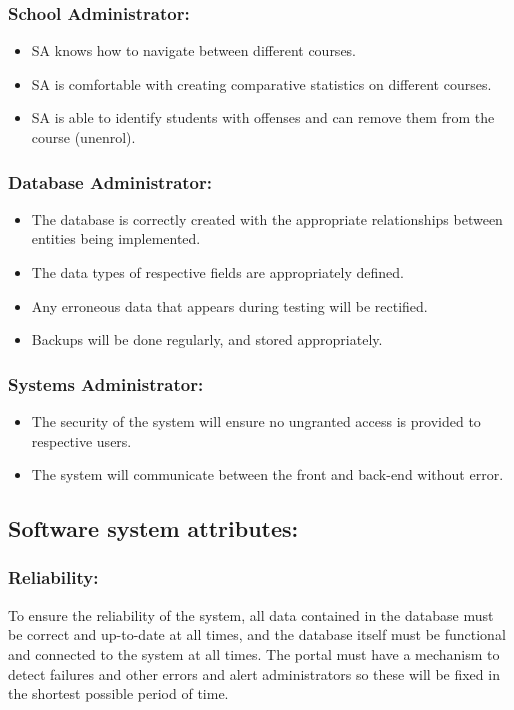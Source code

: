 \documentclass[paper=a4, fontsize=11pt]{scrartcl}
\numberwithin{equation}{section}		%
\numberwithin{figure}{section}			%
\numberwithin{table}{section}				%
\begin{document}
\subsubsection{School Administrator:}
\begin{itemize}
\item SA knows how to navigate between different courses.
\item SA is comfortable with creating comparative statistics on different courses.
\item SA is able to identify students with offenses and can remove them from the course
(unenrol).
\end{itemize}

\subsubsection{Database Administrator:}
\begin{itemize}
\item The database is correctly created with the appropriate relationships between entities
being implemented.
\item The data types of respective fields are appropriately defined.
\item Any erroneous data that appears during testing will be rectified.
\item Backups will be done regularly, and stored appropriately.
\end{itemize}

\subsubsection{Systems Administrator:}
\begin{itemize}
\item The security of the system will ensure no ungranted access is provided to respective
users.
\item The system will communicate between the front and back-end without error. \\
\end{itemize}

\subsection{Software system attributes:}
\subsubsection{Reliability:}
To ensure the reliability of the system, all data contained in the database must be correct
and up-to-date at all times, and the database itself must be functional and connected to the
system at all times. The portal must have a mechanism to detect failures and other errors
and alert administrators so these will be fixed in the shortest possible period of time.
\end{document}
